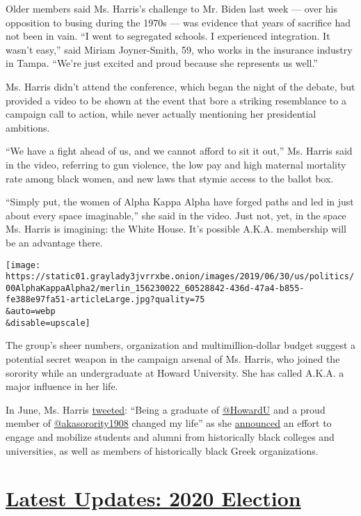 Older members said Ms. Harris's challenge to Mr. Biden last week ---
over his opposition to busing during the 1970s --- was evidence that
years of sacrifice had not been in vain. ``I went to segregated schools.
I experienced integration. It wasn't easy,'' said Miriam Joyner-Smith,
59, who works in the insurance industry in Tampa. ``We're just excited
and proud because she represents us well.''

Ms. Harris didn't attend the conference, which began the night of the
debate, but provided a video to be shown at the event that bore a
striking resemblance to a campaign call to action, while never actually
mentioning her presidential ambitions.

``We have a fight ahead of us, and we cannot afford to sit it out,'' Ms.
Harris said in the video, referring to gun violence, the low pay and
high maternal mortality rate among black women, and new laws that stymie
access to the ballot box.

``Simply put, the women of Alpha Kappa Alpha have forged paths and led
in just about every space imaginable,'' she said in the video. Just not,
yet, in the space Ms. Harris is imagining: the White House. It's
possible A.K.A. membership will be an advantage there.

\texttt{[image: https://static01.graylady3jvrrxbe.onion/images/2019/06/30/us/politics/00AlphaKappaAlpha2/merlin\_156230022\_60528842-436d-47a4-b855-fe388e97fa51-articleLarge.jpg?quality=75\\\&auto=webp\\\&disable=upscale]}

The group's sheer numbers, organization and multimillion-dollar budget
suggest a potential secret weapon in the campaign arsenal of Ms. Harris,
who joined the sorority while an undergraduate at Howard University. She
has called A.K.A. a major influence in her life.

In June, Ms. Harris
\href{https://twitter.com/KamalaHarris/status/1141375083807748096}{tweeted}:
``Being a graduate of \href{https://twitter.com/HowardU}{@HowardU} and a
proud member of
\href{https://twitter.com/akasorority1908}{@akasorority1908} changed my
life'' as she
\href{https://www.thestate.com/news/politics-government/politics-columns-blogs/the-buzz/article231726103.html}{announced}
an effort to engage and mobilize students and alumni from historically
black colleges and universities, as well as members of historically
black Greek organizations.

\hypertarget{latest-updates-2020-election}{%
\section{\texorpdfstring{\href{https://www.nytimes3xbfgragh.onion/live/2020/08/19/us/dnc-convention-election?action=click\&pgtype=Article\&state=default\&region=MAIN_CONTENT_1\&context=storylines_live_updates}{Latest
Updates: 2020
Election}}{Latest Updates: 2020 Election}}\label{latest-updates-2020-election}}

